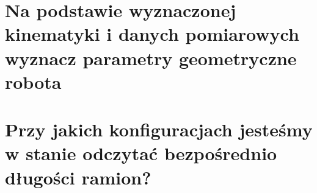\documentclass[12pt,a4paper]{article}
\begin{document}
  \section{Na podstawie wyznaczonej kinematyki i danych pomiarowych wyznacz
  parametry geometryczne robota}
  

  \section{Przy jakich konfiguracjach jesteśmy w stanie odczytać bezpośrednio
  długości ramion?}











\end{document}
